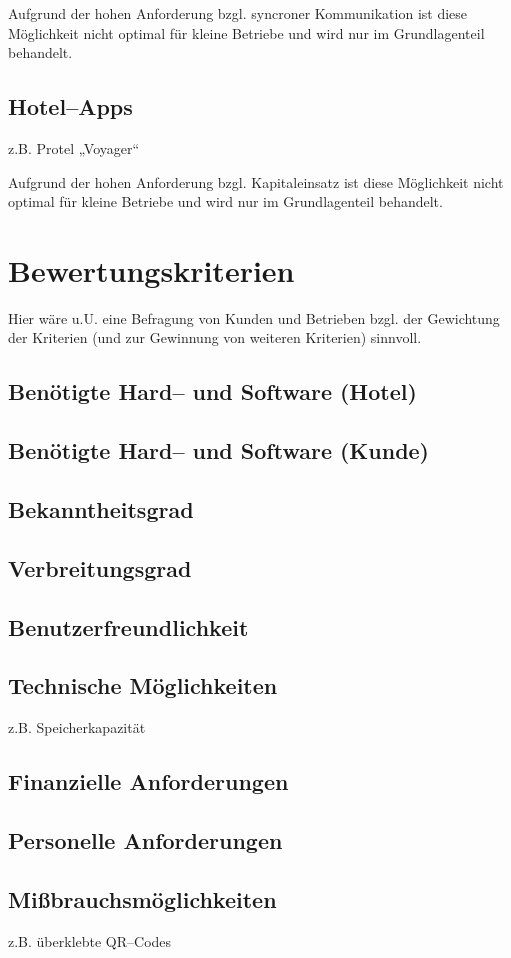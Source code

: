 Aufgrund der hohen Anforderung bzgl. syncroner Kommunikation ist diese Möglichkeit nicht optimal für kleine Betriebe und wird nur im Grundlagenteil behandelt.

\subsection{Hotel--Apps}

z.B. Protel „Voyager“

Aufgrund der hohen Anforderung bzgl. Kapitaleinsatz ist diese Möglichkeit nicht optimal für kleine Betriebe und wird nur im Grundlagenteil behandelt.

\section{Bewertungskriterien}
\label{sec:kriterien}

Hier wäre u.U. eine Befragung von Kunden und Betrieben bzgl. der Gewichtung der Kriterien (und zur Gewinnung von weiteren Kriterien) sinnvoll.

\subsection{Benötigte Hard-- und Software (Hotel)}
\subsection{Benötigte Hard-- und Software (Kunde)}
\subsection{Bekanntheitsgrad}
\subsection{Verbreitungsgrad}
\subsection{Benutzerfreundlichkeit}
\subsection{Technische Möglichkeiten}
z.B. Speicherkapazität

\subsection{Finanzielle Anforderungen}
\subsection{Personelle Anforderungen}
\subsection{Mißbrauchsmöglichkeiten}
z.B. überklebte QR--Codes